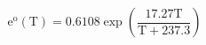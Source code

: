 \documentclass[12pt]{article}
\begin{document}
\begin{displaymath}
\mathrm{e}^{\mathrm{o}}(\mathrm{T})=0.6108 \exp \left(\frac{17.27 \mathrm{T}}{\mathrm{T}+237.3}\right)
\end{displaymath}
\end{document}
